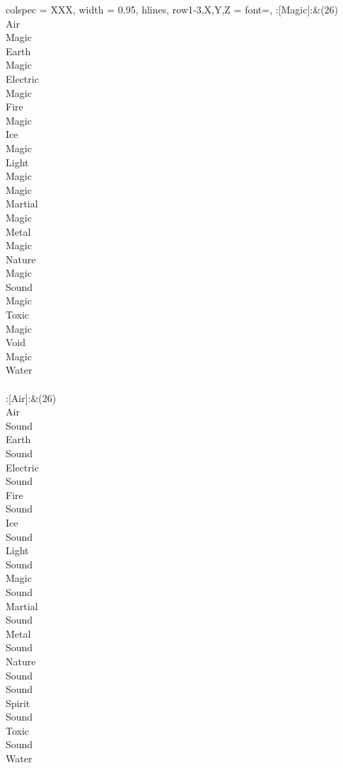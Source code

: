 \begin{longtblr}[
	caption = {2v1 Defending Resisted},
	label = {2v1-Defending-Resisted},
]{
	colspec = {XXX}, width = 0.95\linewidth,
	hlines,
	row{1-3,X,Y,Z} = {font=\bfseries},
}
	:[Magic]:&{(26)\\
	Air \\
	Magic \\
	Earth \\
	Magic \\
	Electric \\
	Magic \\
	Fire \\
	Magic \\
	Ice \\
	Magic \\
	Light \\
	Magic \\
	Magic \\
	Martial \\
	Magic \\
	Metal \\
	Magic \\
	Nature \\
	Magic \\
	Sound \\
	Magic \\
	Toxic \\
	Magic \\
	Void \\
	Magic \\
	Water \\
	}\\

	:[Air]:&{(26)\\
	Air \\
	Sound \\
	Earth \\
	Sound \\
	Electric \\
	Sound \\
	Fire \\
	Sound \\
	Ice \\
	Sound \\
	Light \\
	Sound \\
	Magic \\
	Sound \\
	Martial \\
	Sound \\
	Metal \\
	Sound \\
	Nature \\
	Sound \\
	Sound \\
	Spirit \\
	Sound \\
	Toxic \\
	Sound \\
	Water \\
	}\\


\end{longtblr}
